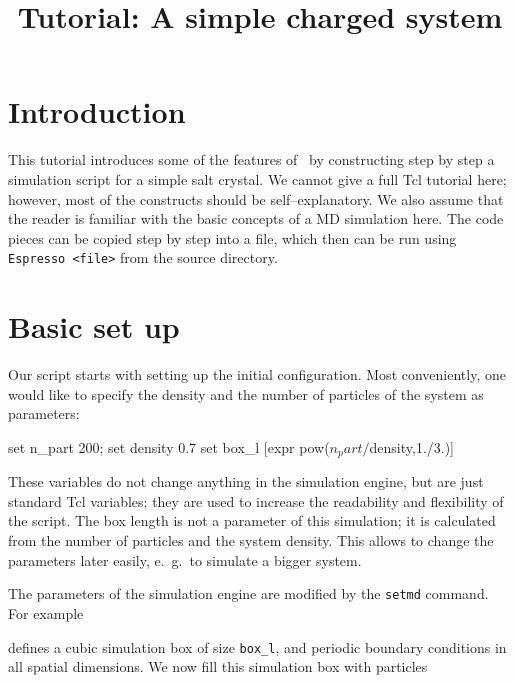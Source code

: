 \documentclass[
a4paper,                        %
11pt,                           %
twoside,                        %
footsepline,                    %
headsepline,                    %
headexclude,                    %
footexclude,                    %
pagesize,                       %
]{scrartcl}
\begin{document}
\esptitlehead
\title{Tutorial: A simple charged system}
\maketitle
\tableofcontents

\section{Introduction}

This tutorial introduces some of the features of \es\ by constructing
step by step a simulation script for a simple salt crystal.  We cannot
give a full Tcl tutorial here; however, most of the constructs should
be self--explanatory. We also assume that the reader is familiar with
the basic concepts of a MD simulation here. The code pieces can be
copied step by step into a file, which then can be run using
\verb|Espresso <file>| from the \es source directory.

\section{Basic set up}

Our script starts with setting up the initial configuration.  Most
conveniently, one would like to specify the density and the number of
particles of the system as parameters:

\begin{tclcode}
  set n_part 200; set density 0.7
  set box_l [expr pow($n_part/$density,1./3.)]
\end{tclcode}

These variables do not change anything in the simulation engine, but
are just standard Tcl variables; they are used to increase the
readability and flexibility of the script. The box length is not a
parameter of this simulation; it is calculated from the number of
particles and the system density. This allows to change the parameters
later easily, e.~g.\ to simulate a bigger system.

The parameters of the simulation engine are modified by the
\verb|setmd| command. For example


defines a cubic simulation box of size \verb|box_l|, and periodic
boundary conditions in all spatial dimensions. We now fill this
simulation box with particles
\end{document}
